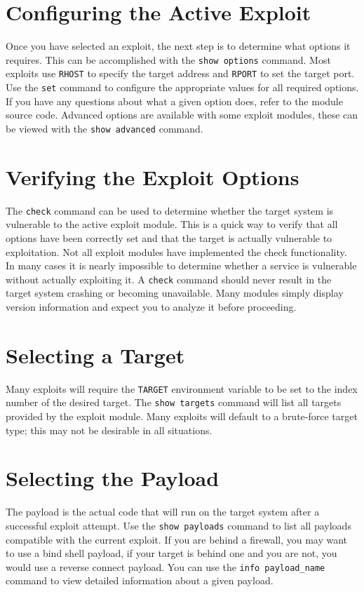\documentclass{report}
\begin{document}
	\section{Configuring the Active Exploit}
\par
Once you have selected an exploit, the next step is to determine what options it
requires. This can be accomplished with the \texttt{show options} command. Most exploits
use \texttt{RHOST} to specify the target address and \texttt{RPORT} to set the target port. Use
the \texttt{set} command to configure the appropriate values for all required options. If
you have any questions about what a given option does, refer to the module
source code. Advanced options are available with some exploit modules, these can
be viewed with the \texttt{show advanced} command. 

	\section{Verifying the Exploit Options}
\par	
The \texttt{check} command can be used to determine whether the target system is
vulnerable to the active exploit module. This is a quick way to verify that all
options have been correctly set and that the target is actually vulnerable to
exploitation. Not all exploit modules have implemented the check functionality.
In many cases it is nearly impossible to determine whether a service is
vulnerable without actually exploiting it. A \texttt{check} command should never result
in the target system crashing or becoming unavailable. Many modules simply
display version information and expect you to analyze it before proceeding.  


	\section{Selecting a Target}
\par
Many exploits will require the \texttt{TARGET} environment variable to be set to the
index number of the desired target. The \texttt{show targets} command will list all
targets provided by the exploit module. Many exploits will default to a
brute-force target type; this may not be desirable in all situations. 

	\section{Selecting the Payload}
\par	
The payload is the actual code that will run on the target system after a
successful exploit attempt. Use the \texttt{show payloads} command to list all payloads
compatible with the current exploit. If you are behind a firewall, you may want
to use a bind shell payload, if your target is behind one and you are not, you
would use a reverse connect payload. You can use the \texttt{info payload\_name} command
to view detailed information about a given payload.  
\end{document}
